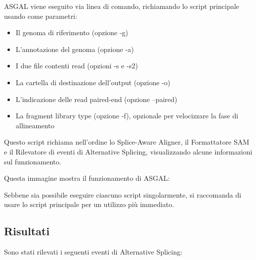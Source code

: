 ASGAL viene eseguito via linea di comando, richiamando lo script principale usando come parametri:

\begin{itemize}
	\item Il genoma di riferimento (opzione -g)
	\item L'annotazione del genoma (opzione -a)
	\item I due file contenti read (opzioni -s e -s2)
	\item La cartella di destinazione dell'output (opzione -o)
	\item L'indicazione delle read paired-end (opzione --paired)
	\item La fragment library type (opzione -f), opzionale per velocizzare la fase di allineamento
\end{itemize}

Questo script richiama nell'ordine lo Splice-Aware Aligner, il Formattatore SAM e il Rilevatore di eventi di Alternative Splicing, visualizzando alcune informazioni sul funzionamento.

Questa immagine mostra il funzionamento di ASGAL:

Sebbene sia possibile eseguire ciascuno script singolarmente, si raccomanda di usare lo script principale per un utilizzo più immediato. 

\newpage

\subsection{Risultati}

Sono stati rilevati i seguenti eventi di Alternative Splicing:



\newpage